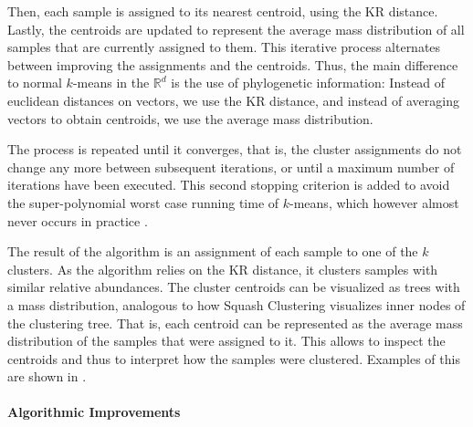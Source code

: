 Then, each sample is assigned to its nearest centroid, using the KR distance. %
Lastly, the centroids are updated to represent
the average mass distribution of all samples that are currently assigned to them.
This iterative process alternates between improving the assignments and the centroids.
Thus, the main difference to normal $k$-means in the $\mathbb{R}^d$ is the use of phylogenetic information:
Instead of euclidean distances on vectors, we use the KR distance,
and instead of averaging vectors to obtain centroids, we use the average mass distribution.

The process is repeated until it converges,
that is, the cluster assignments do not change any more between subsequent iterations,
or until a maximum number of iterations have been executed.
This second stopping criterion is added to avoid the super-polynomial worst case running time of $k$-means,
which however almost never occurs in practice \cite{Bottou1995,Arthur2006}.

The result of the algorithm is an assignment of each sample to one of the $k$ clusters.
As the algorithm relies on the KR distance, it clusters samples with similar relative abundances.
The cluster centroids can be visualized as trees with a mass distribution,
analogous to how Squash Clustering visualizes inner nodes of the clustering tree.
That is, each centroid can be represented as the average mass distribution of the samples that were assigned to it.
This allows to inspect the centroids and thus to interpret how the samples were clustered.
Examples of this are shown in .


\paragraph{Algorithmic Improvements}
\label{ch:Clustering:sec:Methods:sub:PhylogeneticKmeans:par:AlgorithmicImprovements}

